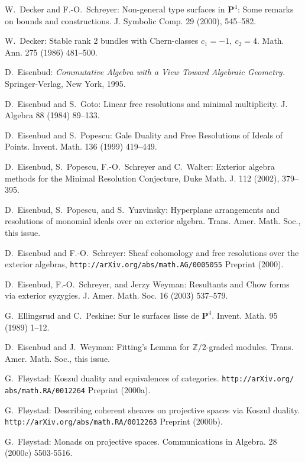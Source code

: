 \documentclass{tran-l}
\theoremstyle{plain}
\theoremstyle{remark}
\theoremstyle{definition}
\begin{document}
\begin{thebibliography}{EPSW}
W.~Decker and F.-O.~Schreyer: 
Non-general type surfaces in $\mathbf{P}^{4}$: 
Some remarks on bounds and constructions. 
J. Symbolic Comp. 29 (2000), 545--582.

W.~Decker: Stable rank 2 bundles with Chern-classes
$c_{1}=-1,\ c_{2}=4$. Math. Ann. 275 (1986) 481--500.


D.~Eisenbud: {\sl Commutative Algebra with a View Toward
Algebraic Geometry.} Springer-Verlag, New York, 1995.

D.~Eisenbud and S.~Goto: Linear free resolutions and minimal
multiplicity.  J. Algebra 88 (1984) 89--133.

D.~Eisenbud and S.~Popescu:
Gale Duality and Free Resolutions of Ideals of Points.
Invent. Math. 136 (1999) 419--449.

D.~Eisenbud, S.~Popescu, F.-O.~Schreyer and C.~Walter:
Exterior algebra methods for the Minimal Resolution Conjecture,
Duke Math. J. 112 (2002), 379--395.


D.~Eisenbud, S.~Popescu, and S.~Yuzvinsky: Hyperplane
arrangements and resolutions of monomial ideals over an
exterior algebra. Trans. Amer. Math. Soc., this issue.


D.~Eisenbud and F.-O.~Schreyer: Sheaf cohomology and free resolutions over 
the exterior algebras,
{\tt http://arXiv.org/abs/math.AG/0005055}
Preprint (2000).

D.~Eisenbud, F.-O.~Schreyer, and Jerzy Weyman: Resultants and 
Chow forms via exterior syzygies.
J. Amer. Math. Soc. 16 (2003) 537--579.

G.~Ellingsrud and C.~Peskine: Sur le surfaces lisse de $\mathbf{P}^{4}$.
Invent. Math. 95 (1989) 1--12.

D.~Eisenbud and J.~Weyman:
Fitting's Lemma for ${\mathbb{Z}}/{2}$-graded modules.
Trans. Amer. Math. Soc., this issue.


G.~Fl\o ystad: Koszul duality and equivalences of categories.
{\tt http://arXiv.org/ abs/math.RA/0012264}
Preprint (2000a).

G.~Fl\o ystad: Describing coherent sheaves on projective spaces via Koszul
duality.
{\tt http://arXiv.org/abs/math.RA/0012263}
Preprint (2000b).

G.~Fl\o ystad: Monads on projective spaces. 
Communications in Algebra. 28 (2000c) 5503-5516.


\end{thebibliography}
\end{document}
